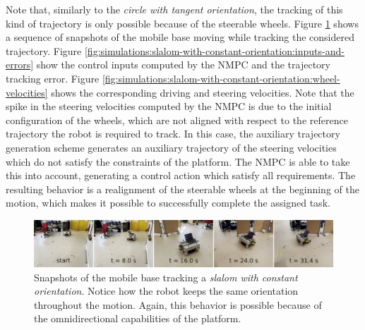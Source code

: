 Note that, similarly to the \textit{circle with tangent orientation},
the tracking of this kind of trajectory is only possible because of the
steerable wheels.
Figure \ref{fig:experiments:slalom-with-constant-orientation:snapshots} shows
a sequence of snapshots of the mobile base moving while tracking the considered
trajectory.
Figure \ref{fig:simulations:slalom-with-constant-orientation:inputs-and-errors}
show the control inputs computed by the NMPC and the trajectory tracking error.
Figure \ref{fig:simulations:slalom-with-constant-orientation:wheel-velocities} 
shows the corresponding driving and steering velocities. Note that the spike 
in the steering velocities computed by the NMPC is due to the initial 
configuration of the wheels, which are not aligned with respect to the 
reference trajectory the robot is required to track.
In this case, the auxiliary trajectory generation scheme 
generates an auxiliary trajectory of the steering velocities which do not 
satisfy the constraints of the platform. The NMPC is able to take this into 
account, generating a control action which satisfy all requirements. The
resulting behavior is a realignment of the steerable wheels at the beginning of 
the motion, which makes it possible to successfully complete the assigned task.
\begin{figure}
    \centering
    \includegraphics[width=\textwidth]{figures/SWMR/simulations/slalom_with_constant_orientation/snapshots.jpeg}
    \caption{Snapshots of the mobile base tracking a
        \textit{slalom with constant orientation}. Notice how the robot keeps 
        the same orientation throughout the motion. Again, this behavior
        is possible because of the omnidirectional capabilities of the platform.
    }
    \label{fig:experiments:slalom-with-constant-orientation:snapshots}
\end{figure}
